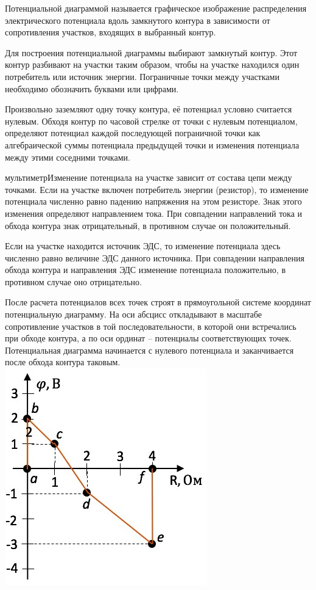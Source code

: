 \documentclass[a4paper, 12pt]{article}
\begin{document}
Потенциальной диаграммой называется графическое изображение распределения электрического потенциала вдоль замкнутого контура в зависимости от сопротивления участков, входящих в выбранный контур. 

Для построения потенциальной диаграммы выбирают замкнутый контур. Этот контур разбивают на участки таким образом, чтобы на участке находился один потребитель или источник энергии. Пограничные точки между участками необходимо обозначить буквами или цифрами.

Произвольно заземляют одну точку контура, её потенциал условно считается нулевым. Обходя контур по часовой стрелке от точки с нулевым потенциалом, определяют потенциал каждой последующей пограничной точки как алгебраической суммы потенциала предыдущей точки и изменения потенциала между этими соседними точками.

мультиметрИзменение потенциала на участке зависит от состава цепи между точками. Если на участке включен потребитель энергии (резистор), то изменение потенциала численно равно падению напряжения на этом резисторе. Знак этого изменения определяют направлением тока. При совпадении направлений тока и обхода контура знак отрицательный, в противном случае он положительный.

Если на участке находится источник ЭДС, то изменение потенциала здесь численно равно величине ЭДС данного источника. При совпадении направления обхода контура и направления ЭДС изменение потенциала положительно, в противном случае оно отрицательно.

После расчета потенциалов всех точек строят в прямоугольной системе координат потенциальную диаграмму. На оси абсцисс откладывают в масштабе сопротивление участков в той последовательности, в которой они встречались при обходе контура, а по оси ординат – потенциалы соответствующих точек. Потенциальная диаграмма начинается с нулевого потенциала и заканчивается после обхода контура таковым. \\
\includegraphics{25-1.png}
\end{document}
